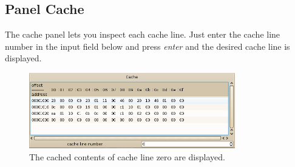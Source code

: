 \subsection{Panel Cache}
The cache panel lets you inspect each cache line. Just enter the cache line number in the input field below and press \emph{enter} and the desired cache line is displayed.
\begin{figure}[H]
\begin{center}
	\includegraphics[width=0.8\textwidth]{./files/emu_gui_mem_cache.png}
\end{center}
	\caption{The cached contents of cache line zero are displayed.}
\end{figure}